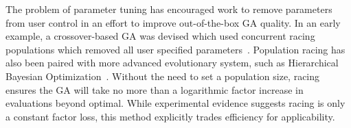 \documentclass{sig-alternate}
\begin{document}
\begin{comment}
Often built into the design of a genetic algorithm (GA) are
evolutionary parameters which allow the user to tune the optimizer's
assumptions to match a specific problem.  These parameters can allow
a GA to more efficiently search the problem's landscape.  However, to
do so the user must first determine how to correctly \textbf{tune} the
parameters, typically a complex and time consuming process unto
itself.

Some considerable work has been devoted to understanding how to tune
these parameters. Early work in Evolutionary Strategies introduced the
concept of self-adaptive evolution which was subsequently introduced
to genetic algorithms~\cite{Back:1992:selfadapt}. Here, each solution
carries some of the parameters used and those parameters are adapted
along with the solution they are co-encoded with. Other work introduced the concept
of a \emph{meta} algorithm~\cite{grefenstette:1986:optimalga}. Here a
second optimizer runs ``on top'' of the actual problem-solving
optimizer, the second slowly tuning the parameters of the first. Both
of these approaches are rather slow, in particular the meta
approach, as actual problem solving must occur at set levels to give
feedback as to how to change the parameters (online or to the meta
optimizer). 

Many parameters have ``reasonable'' settings that are
unlikely to effect the order of complexity of a genetic algorithm,
with population size being a notable exception. For example, an overly small
population can cause exponential search times, while arbitrarily large
population sizes can lead to wasted evaluations and stalled search.
More importantly, setting the population size correctly relies on
difficult to discern features of each problem. 
Goldberg~\cite{goldberg:1991:gasize} showed that small
population sizes were not capable of finding good solutions, though
some practitioners~\cite{haupt:2000:optimum} have found that small
populations with a large mutation rate are effective on some practical
problems.
\end{comment}

The problem of parameter tuning has encouraged work to remove parameters from
user control in an effort to improve out-of-the-box GA quality. In
an early example, a crossover-based GA was devised which used
concurrent racing populations which removed all user specified
parameters~\cite{harik:1999:parameterlessga}.
Population racing has also been paired with more advanced evolutionary
system, such as Hierarchical Bayesian
Optimization~\cite{pelikan:2004:parameterlesshboa}.
Without the need to set a population size, racing ensures the GA will take no more than
a logarithmic factor increase in evaluations beyond optimal.
While experimental evidence suggests racing is only a constant
factor loss, this method explicitly trades efficiency for applicability.
\end{document}
